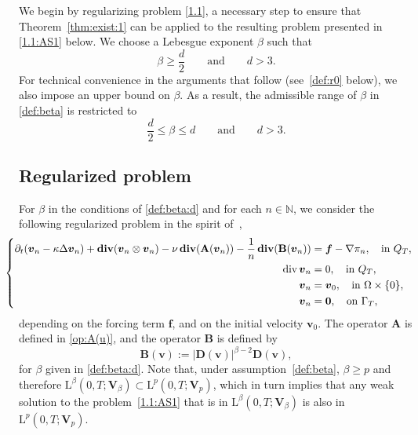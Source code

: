 \documentclass[12pt,reqno]{amsart}
\numberwithin{equation}{section}
\let\originalleft\left
\let\originalright\right
\renewcommand{\left}{\mathopen{}\mathclose\bgroup\originalleft}
\renewcommand{\right}{\aftergroup\egroup\originalright}
\theoremstyle{definition}
\def\1{\Omega}
\def\div{\operatorname{div}}
\def\divv{\mathbf{div}\,}
\def\L{\mathrm{L}}
\def\vv{\boldsymbol{v}}
\def\f{\boldsymbol{f}}
\def\N{\mathbb{N}}
\def\bfB{\mathbf{B}}
\def\bfV{\mathbf{V}}
\def\bfD{\mathbf{D}}
\def\bfA{\mathbf{A}}
\begin{document}
{
We begin by regularizing problem \eqref{1.1}, a necessary step to ensure that Theorem~\ref{thm:exist:1} can be applied to the resulting problem presented in \eqref{1.1:AS1} below.
We choose a Lebesgue exponent $\beta$ such that
\begin{equation}\label{def:beta}
\beta \geq \frac{d}{2}\qquad \mbox{and}\qquad d>3.
\end{equation}
For technical convenience in the arguments that follow (see~\eqref{def:r0} below), we also impose an upper bound on $\beta$.
As a result, the admissible range of $\beta$ in \eqref{def:beta} is restricted to
\begin{equation}\label{def:beta:d}
\frac{d}{2} \leq \beta \leq d\qquad \mbox{and}\qquad d>3.
\end{equation}
}
{


\subsection{Regularized problem}


For $\beta$ in the conditions of \eqref{def:beta:d} and for each $n\in\N$, we consider the following regularized problem in the spirit of~\cite{ZhikovPastukhova2011},
{\begin{equation}\label{1.1:AS1}
	\hspace{-0.485cm}\left\{	
	\begin{aligned}
		{\partial_t(\vv_n -\kappa\Delta \vv_n)+\divv\!(\vv_n\otimes \vv_n)- \nu\,\divv\!(\bfA(\vv_n))} - \frac{1}{n}\,\divv\!(\bfB(\vv_n))  & = \f -\nabla\pi_n,\quad \text{in}\ Q_T ,  \\
		\div\vv_n &=0,\quad \text{in}\ Q_T,  \\
		\vv_n &=\vv_{0},\quad \text{in}\ \1\times\{0\},  \\
		\vv_n &=\boldsymbol{0},\quad \text{on}\ \Gamma_T,
		\end{aligned}
\right.
\end{equation}
depending on the forcing term $\f$, and on the initial velocity $\vv_0$.}
The operator $\bfA$ is defined in \eqref{op:A(u)}, and the operator $\bfB$ is defined by
\begin{equation*}%
\bfB(\vv):=|\bfD(\vv)|^{\beta-2}\bfD(\vv),
\end{equation*}
for $\beta$ given in \eqref{def:beta:d}.
Note that, under assumption~\eqref{def:beta}, $\beta \geq p$ and therefore
$\L^\beta(0,T;\bfV_\beta) \subset \L^p(0,T;\bfV_p)$, which in turn implies that any weak solution to the problem~\eqref{1.1:AS1} that is in $\L^\beta(0,T;\bfV_\beta)$ is also in $\L^p(0,T;\bfV_p)$.
}
\end{document}
